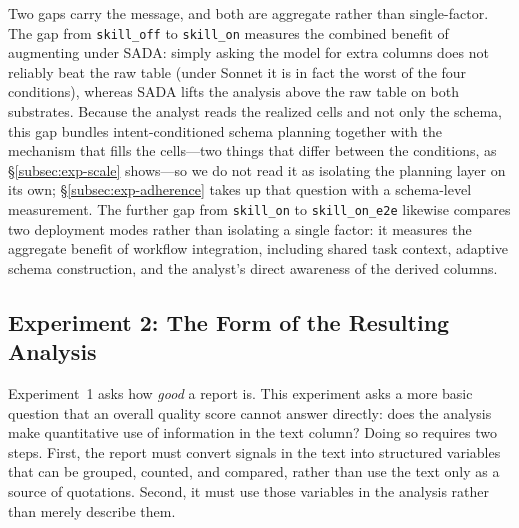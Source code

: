 Two gaps carry the message, and both are aggregate rather than single-factor. The gap from \texttt{skill\_off} to \texttt{skill\_on} measures the combined benefit of augmenting under SADA: simply asking the model for extra columns does not reliably beat the raw table (under Sonnet it is in fact the worst of the four conditions), whereas SADA lifts the analysis above the raw table on both substrates. Because the analyst reads the realized cells and not only the schema, this gap bundles intent-conditioned schema planning together with the mechanism that fills the cells---two things that differ between the conditions, as \S\ref{subsec:exp-scale} shows---so we do not read it as isolating the planning layer on its own; \S\ref{subsec:exp-adherence} takes up that question with a schema-level measurement. The further gap from \texttt{skill\_on} to \texttt{skill\_on\_e2e} likewise compares two deployment modes rather than isolating a single factor: it measures the aggregate benefit of workflow integration, including shared task context, adaptive schema construction, and the analyst's direct awareness of the derived columns.

\subsection{Experiment 2: The Form of the Resulting Analysis}
\label{subsec:exp-form}

Experiment~1 asks how \emph{good} a report is. This experiment asks a more basic question that an overall quality score cannot answer directly: does the analysis make quantitative use of information in the text column? Doing so requires two steps. First, the report must convert signals in the text into structured variables that can be grouped, counted, and compared, rather than use the text only as a source of quotations. Second, it must use those variables in the analysis rather than merely describe them.

